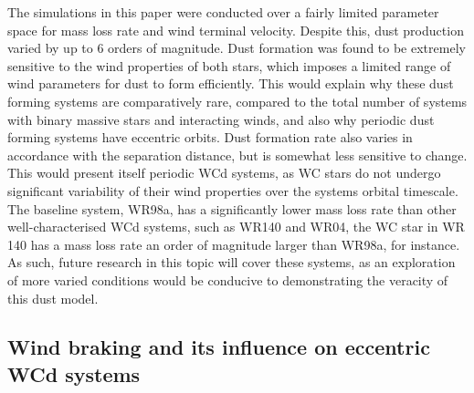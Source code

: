 The simulations in this paper were conducted over a fairly limited parameter space for mass loss rate and wind terminal velocity.
Despite this, dust production varied by up to 6 orders of magnitude.
Dust formation was found to be extremely sensitive to the wind properties of both stars, which imposes a limited range of wind parameters for dust to form efficiently.
This would explain why these dust forming systems are comparatively rare, compared to the total number of systems with binary massive stars and interacting winds, and also why periodic dust forming systems have eccentric orbits.
Dust formation rate also varies in accordance with the separation distance, but is somewhat less sensitive to change.
This would present itself periodic WCd systems, as WC stars do not undergo significant variability of their wind properties over the systems orbital timescale.
The baseline system, WR98a, has a significantly lower mass loss rate than other well-characterised WCd systems, such as WR140 and WR04, the WC star in WR 140 has a mass loss rate an order of magnitude larger than WR98a, for instance.
As such, future research in this topic will cover these systems, as an exploration of more varied conditions would be conducive to demonstrating the veracity of this dust model.

\subsection{Wind braking and its influence on eccentric WCd systems}


